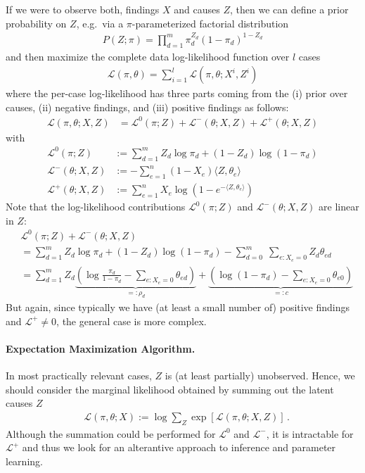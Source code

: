 \documentclass{article}
\newcommand{\loglike}{{\mathcal L}}
\begin{document}
If we were to observe both, findings $X$ and causes $Z$, then we can define a prior probability on $Z$, e.g.~via a $\pi$-parameterized factorial distribution 
\begin{align}
P(Z; \pi) = \prod_{d=1}^m \pi_d^{Z_d} (1-\pi_d)^{1-Z_d} 
\end{align}
and then maximize the complete data log-likelihood function over $l$ cases
\begin{align}
\loglike(\pi,\theta) = \sum_{i=1}^l \loglike(\pi,\theta; X^i, Z^i)
\end{align}
where the per-case log-likelihood has three parts coming from the (i) prior over causes, (ii) negative findings, and (iii) positive findings as follows:  
\begin{align}
\label{eq:cond-log-like}
\loglike(\pi,\theta; X, Z)  & = \loglike^0(\pi; Z) + \loglike^-(\theta; X, Z) + \loglike^+(\theta; X, Z) 
\end{align}
with
\begin{align}
\loglike^0(\pi; Z) & :=  \sum_{d=1}^m Z_d \log \pi_d + (1-Z_d) \log (1-\pi_d) \nonumber  \\
\loglike^-(\theta; X, Z) & := -\sum_{e=1}^n (1-X_e)  \langle Z, \theta_{e} \rangle \nonumber \\
\loglike^+(\theta; X,Z) & := \sum_{e=1}^n X_e \log \left( 1-  e^{-\langle Z, \theta_e \rangle} \right) \nonumber
\end{align}
%
Note that the log-likelihood contributions $\loglike^0(\pi; Z)$ and $\loglike^-(\theta; X, Z)$ are linear in $Z$:
\begin{align} 
& \loglike^0(\pi; Z) + \loglike^-(\theta; X, Z)  \nonumber \\
& = \sum_{d=1}^m Z_d \log \pi_d + (1-Z_d) \log (1-\pi_d) - \sum_{d=0}^m \; \sum_{e: X_e=0}  Z_d \theta_{ed}
\nonumber  \\
& = \sum_{d=1}^m Z_d \underbrace{\left( \log \frac{\pi_d}{1-\pi_d} - \sum_{e: X_e=0} \theta_{ed} \right)}_{=:\rho_d}
 + \underbrace{ \left(  \log (1- \pi_d) - \sum_{e: X_e=0} \theta_{e0} \right) }_{=:c}
\label{eq:exact-sum}
\end{align} 
But again, since typically we have (at least a small number of) positive findings and $\loglike^+ \neq 0$, the general case is more complex. 

\paragraph{Expectation Maximization Algorithm.}

In most practically relevant cases, $Z$ is (at least partially) unobserved. Hence, we should consider the marginal likelihood obtained by summing out the latent causes $Z$
\begin{align}
& \loglike(\pi, \theta; X) := \log \sum_{Z} \exp\left[ \loglike(\pi, \theta; X, Z) \right]
\,.
\label{eq:marginal-loglike}
\end{align}
Although the summation could be performed for $\loglike^0$ and $ \loglike^-$, it is intractable for $\loglike^+$ and thus we look for an alterantive approach to inference and parameter learning. 
\end{document}
